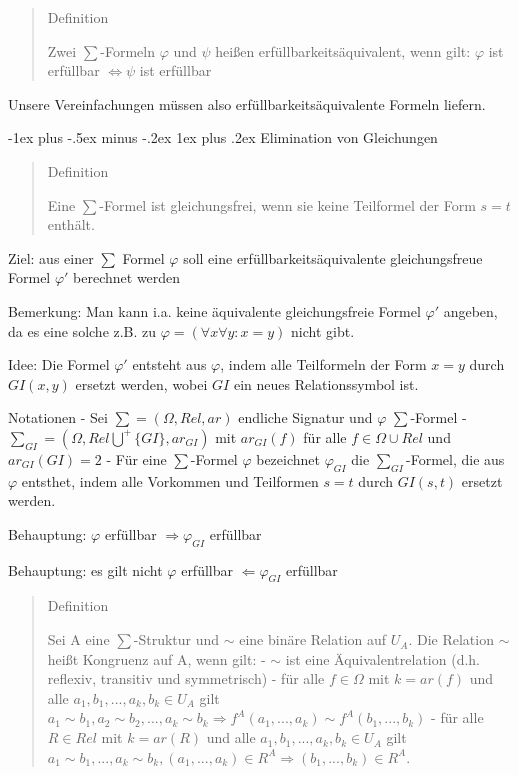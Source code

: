 \documentclass[a4paper]{article}
\makeatletter
\renewcommand{\subsubsection}{\@startsection{subsubsection}{3}{0mm}%
                {-1ex plus -.5ex minus -.2ex}%
                {1ex plus .2ex}%
                {\normalfont\small\bfseries}}
\makeatother
\begin{document}
\begin{multicols}{3}
  \begin{quote}
    Definition

    Zwei $\sum$-Formeln $\varphi$ und $\psi$ heißen
    erfüllbarkeitsäquivalent, wenn gilt: $\varphi$ ist erfüllbar
    $\Leftrightarrow\psi$ ist erfüllbar
  \end{quote}

  Unsere Vereinfachungen müssen also erfüllbarkeitsäquivalente Formeln
  liefern.

  \subsubsection{Elimination von
    Gleichungen}\label{elimination-von-gleichungen}

  \begin{quote}
    Definition

    Eine $\sum$-Formel ist gleichungsfrei, wenn sie keine Teilformel der
    Form $s=t$ enthält.
  \end{quote}

  Ziel: aus einer $\sum$ Formel $\varphi$ soll eine
  erfüllbarkeitsäquivalente gleichungsfreue Formel $\varphi'$ berechnet
  werden

  Bemerkung: Man kann i.a. keine äquivalente gleichungsfreie Formel
  $\varphi'$ angeben, da es eine solche z.B. zu
  $\varphi=(\forall x\forall y:x=y)$ nicht gibt.

  Idee: Die Formel $\varphi'$ entsteht aus $\varphi$, indem alle
  Teilformeln der Form $x=y$ durch $GI(x,y)$ ersetzt werden, wobei $GI$
  ein neues Relationssymbol ist.

  Notationen - Sei $\sum=(\Omega,Rel,ar)$ endliche Signatur und $\varphi$
  $\sum$-Formel - $\sum_{GI} = (\Omega, Rel\bigcup^+\{GI\},ar_{GI})$ mit
  $ar_{GI}(f)$ für alle $f\in\Omega\cup Rel$ und $ar_{GI}(GI)=2$ - Für
  eine $\sum$-Formel $\varphi$ bezeichnet $\varphi_{GI}$ die
  $\sum_{GI}$-Formel, die aus $\varphi$ entsthet, indem alle Vorkommen und
  Teilformen $s=t$ durch $GI(s,t)$ ersetzt werden.

  Behauptung: $\varphi$ erfüllbar $\Rightarrow \varphi_{GI}$ erfüllbar

  Behauptung: es gilt nicht $\varphi$ erfüllbar $\Leftarrow\varphi_{GI}$
  erfüllbar

  \begin{quote}
    Definition

    Sei A eine $\sum$-Struktur und $\sim$ eine binäre Relation auf $U_A$.
    Die Relation $\sim$ heißt Kongruenz auf A, wenn gilt: - $\sim$ ist eine
    Äquivalentrelation (d.h. reflexiv, transitiv und symmetrisch) - für alle
    $f\in\Omega$ mit $k=ar(f)$ und alle $a_1,b_1,...,a_k,b_k\in U_A$ gilt
    $a_1\sim b_1,a_2\sim b_2,...,a_k\sim b_k\Rightarrow f^A(a_1,...,a_k)\sim f^A(b_1,...,b_k)$
    - für alle $R\in Rel$ mit $k=ar(R)$ und alle
    $a_1,b_1,...,a_k,b_k\in U_A$ gilt
    $a_1\sim b_1,...,a_k\sim b_k,(a_1,...,a_k)\in R^A\Rightarrow (b_1,...,b_k)\in R^A$.
  \end{quote}


\end{multicols}
\end{document}
